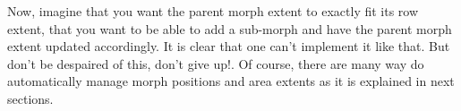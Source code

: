 \documentclass[a4paper,10pt,twoside]{book}
\begin{document}
Now, imagine that you want the parent morph extent to exactly fit its row extent, that you want to be able to add a sub-morph and have the parent morph extent updated accordingly. It is clear that one can't implement it like that. But don't be despaired of this, don't give up!.  Of course, there are many way do automatically manage morph positions and area extents as it is explained in next sections.


%
%
%
%
%
%
%
%
\end{document}
